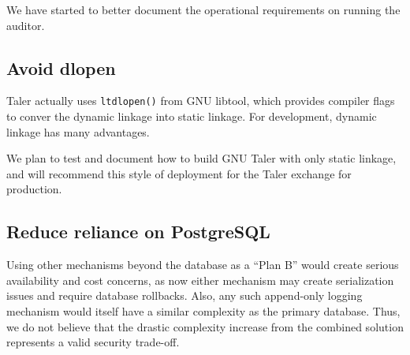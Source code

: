 \documentclass[11pt]{article}
\begin{document}
We have started to better document the operational requirements on running the
auditor.

\subsection{Avoid dlopen}

Taler actually uses {\tt ltdlopen()} from GNU libtool, which provides
compiler flags to conver the dynamic linkage into static linkage.  For
development, dynamic linkage has many advantages.

We plan to test and document how to build GNU Taler with only static
linkage, and will recommend this style of deployment for the Taler
exchange for production.

\subsection{Reduce reliance on PostgreSQL}

Using other mechanisms beyond the database as a ``Plan B'' would create
serious availability and cost concerns, as now either mechanism may create
serialization issues and require database rollbacks.  Also, any such
append-only logging mechanism would itself have a similar complexity as the
primary database.  Thus, we do not believe that the drastic complexity
increase from the combined solution represents a valid security trade-off.
\end{document}
